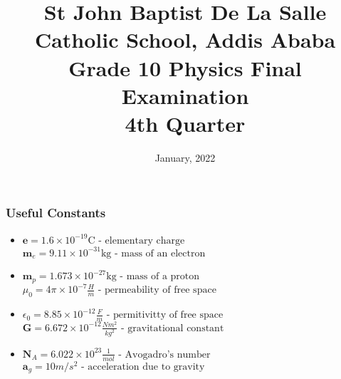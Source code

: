 \documentclass[12pt,addpoints]{exam}
\date{January, 2022}\usepackage{geometry}
\begin{document}
	\title{St John Baptist De La Salle Catholic School, Addis Ababa\\
		\large Grade 10 Physics Final Examination \\
		4th Quarter}
	\maketitle
	\begin{center}
		\subsubsection*{Useful Constants}
		\begin{itemize}
			\item $\textbf{e}=1.6\times10^{-19}\text{C}\text{  - elementary charge}$ \textbf{~}  $\textbf{m}_e=9.11\times10^{-31}\text{kg}\text{  - mass of an electron}$
			\item $\textbf{m}_p=1.673\times10^{-27}\text{kg}\text{  - mass of a proton}$ \textbf{~}$\mu_0=4\pi\times10^{-7}\frac{H}{m}\text{  - permeability of free space}$
			\item $\epsilon_0=8.85\times10^{-12}\frac{F}{m}\text{  - permitivitty of free space}$\textbf{~}$\textbf{G} = 6.672\times10^{-12}\frac{Nm^2}{kg^2}\text{  - gravitational constant}$
			\item $\textbf{N}_A = 6.022\times10^{23}\frac{1}{mol}\text{  - Avogadro's number}$$\textbf{~}$$\textbf{a}_g=10m/s^2\text{  - acceleration due to gravity}$
		\end{itemize}
	\end{center}
\end{document}
